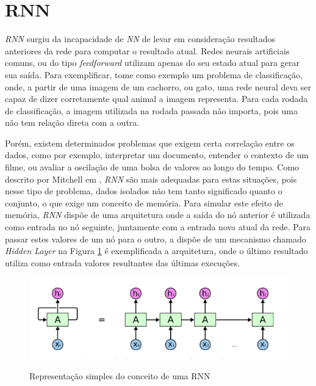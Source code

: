 \section{\acrfull{RNN}}




\textit{\acrshort{RNN}} surgiu da incapacidade de \textit{\acrfull{NN}} de levar em consideração resultados anteriores da rede para computar o resultado atual. Redes neurais artificiais comuns, ou do tipo \textit{feedforward} utilizam apenas do seu estado atual para gerar sua saída. Para exemplificar, tome como exemplo um problema de classificação, onde, a partir de uma imagem de um cachorro, ou gato, uma rede neural deva ser capaz de dizer corretamente qual animal a imagem representa. Para cada rodada de classificação, a imagem utilizada na rodada passada não importa, pois uma não tem relação direta com a outra. 

Porém, existem determinados problemas que exigem certa correlação entre os dados, como por exemplo, interpretar um documento, entender o contexto de um filme, ou avaliar a oscilação de uma bolsa de valores ao longo do tempo. Como descrito por Mitchell em \cite{Mitchell_1997}, \textit{\acrshort{RNN}} são mais adequadas para estas situações, pois nesse tipo de problema, dados isolados não tem tanto significado quanto o conjunto, o que exige um conceito de memória. Para simular este efeito de memória, \textit{\acrshort{RNN}} dispõe de uma arquitetura onde a saída do nó anterior é utilizada como entrada no nó seguinte, juntamente com a entrada nova atual da rede. Para passar estes valores de um nó para o outro, a  dispõe de um mecanismo chamado \textit{Hidden Layer} na Figura \ref{figure:rnn} é exemplificada a arquitetura, onde o último resultado utiliza como entrada valores resultantes das últimas execuções.

\begin{figure}[htbp]
    \centering
    \includegraphics[scale=0.4]{rnnExample.png}
    \label{figure:rnn}
    \caption[Representação simples do conceito de um RNN]{Representação simples do conceito de uma RNN \footnotemark}
\end{figure}

